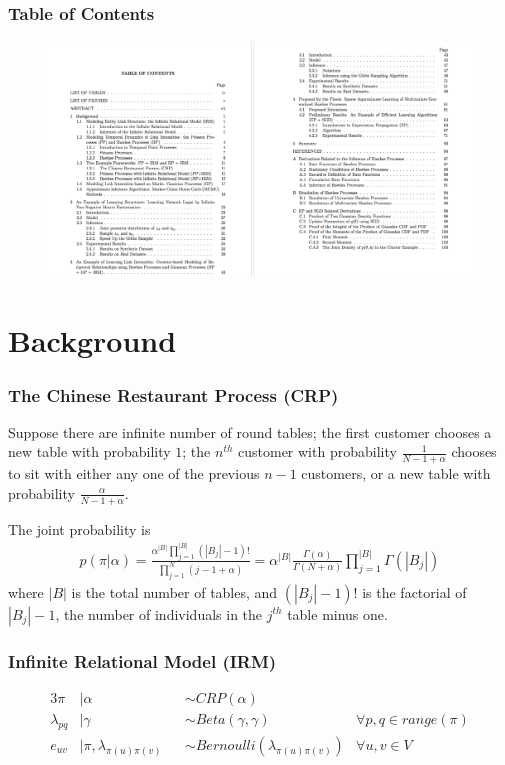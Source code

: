 \documentclass{beamer}
\begin{document}
\begin{frame}
\frametitle{Table of Contents}
\begin{figure}[c]
  \includegraphics[width=\textwidth]{figures/toc.png}  
\end{figure}

\end{frame}

\section{Background}

\begin{frame}
\frametitle{The Chinese Restaurant Process (CRP)}
Suppose there are infinite number of round tables; the first customer chooses a new table with probability $1$; the $n^{th}$ customer with probability $\frac{1}{N-1+\alpha}$ chooses to sit with either any one of the previous $n-1$ customers, or a new table with probability $\frac{\alpha}{N-1+\alpha}$.

The joint probability is
\begin{align}
  p(\pi | \alpha) = \frac{\alpha^{|B|} \prod_{j=1}^{|B|} (|B_j|-1)!}{\prod_{j=1}^N (j-1+\alpha)} = \alpha^{|B|} \frac{\Gamma(\alpha)}{\Gamma(N+\alpha)} \prod_{j=1}^{|B|} \Gamma(|B_j|)
\end{align}
where $|B|$ is the total number of tables, and $(|B_j|-1)!$ is the factorial of $|B_j|-1$, the number of individuals in the $j^{th}$ table minus one.
\end{frame}


\begin{frame}
\frametitle{Infinite Relational Model (IRM)}
\begin{alignat}{3}
	\pi &| \alpha & &\sim CRP(\alpha)\\
	\lambda_{pq} &| \gamma & &\sim Beta(\gamma,\gamma) &\forall p,q \in range(\pi)\\
	e_{uv} &| \pi,\lambda_{\pi(u)\pi(v)} & &\sim Bernoulli(\lambda_{\pi(u)\pi(v)}) &\forall u,v \in V
\end{alignat}
\end{frame}
\end{document}
